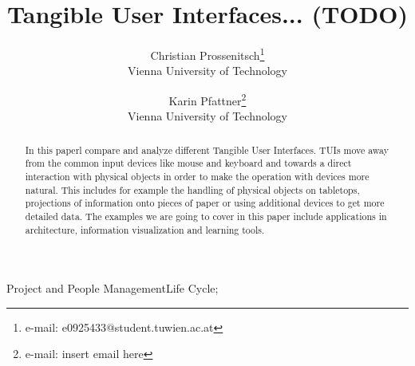 \documentclass[preprint]{acmsiggraph}    %
\title{Tangible User Interfaces... (TODO)}
\author{Christian Prossenitsch\thanks{e-mail: e0925433@student.tuwien.ac.at}\\ Vienna University of Technology %
\and Karin Pfattner\thanks{e-mail: insert email here}\\ Vienna University of Technology}%
\begin{document}

\maketitle


\begin{abstract}


In this paperl compare and analyze different Tangible User Interfaces. TUIs move away from the common input devices like mouse and keyboard and towards a direct interaction with physical objects in order to make the operation with devices more natural. This includes for example the handling of physical objects on tabletops, projections of information onto pieces of paper \cite{holman05} or using additional devices to get more detailed data. The examples we are going to cover in this paper include applications in architecture, information visualization and learning tools. 



\end{abstract}


\begin{CRcatlist}
{Project and People Management}{Life Cycle};
\end{CRcatlist}

\keywordlist









\nocite{*}

\end{document}
